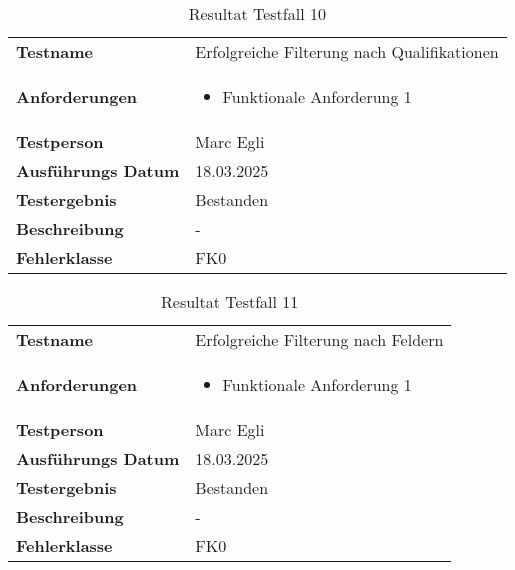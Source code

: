 \begin{table}[H]
    \begin{tabular}{|L{0.3\textwidth}|L{0.65\textwidth}|}
        \hline
           \\[10pt]
        \hline
        \textbf{Testname} & Erfolgreiche Filterung nach Qualifikationen \\
        \hline
        \textbf{Anforderungen} & 
        \begin{itemize}
            \item Funktionale Anforderung 1
        \end{itemize} \\
        \hline
        \textbf{Testperson} & Marc Egli \\
        \hline
        \textbf{Ausführungs Datum} & 18.03.2025 \\
        \hline
        \textbf{Testergebnis} & Bestanden \\
        \hline
        \textbf{Beschreibung} & - \\ 
        \hline
        \textbf{Fehlerklasse} & FK0 \\ 
        \hline
    \end{tabular}
    \caption{Resultat Testfall 10}
\end{table}

\begin{table}[H]
    \begin{tabular}{|L{0.3\textwidth}|L{0.65\textwidth}|}
        \hline
           \\[10pt]
        \hline
        \textbf{Testname} & Erfolgreiche Filterung nach Feldern \\
        \hline
        \textbf{Anforderungen} & 
        \begin{itemize}
            \item Funktionale Anforderung 1
        \end{itemize} \\
        \hline
        \textbf{Testperson} & Marc Egli \\
        \hline
        \textbf{Ausführungs Datum} & 18.03.2025 \\
        \hline
        \textbf{Testergebnis} & Bestanden \\
        \hline
        \textbf{Beschreibung} & - \\ 
        \hline
        \textbf{Fehlerklasse} & FK0 \\ 
        \hline
    \end{tabular}
    \caption{Resultat Testfall 11}
\end{table}

